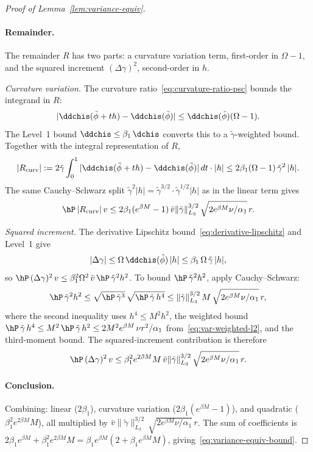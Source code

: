 \documentclass{article}
\begin{document}
\begin{proof}[Proof of Lemma~\ref{lem:variance-equiv}]
\paragraph{Remainder.}
The remainder $R$ has two parts:
a curvature variation term,
first-order in $\Omega - 1$,
and the squared increment $(\Delta\gamma)^2$,
second-order in $h$.

\emph{Curvature variation.}
The curvature ratio~\eqref{eq:curvature-ratio-psc} bounds
the integrand in $R$:
\[
|\ddchis(\tilde\phi+th) - \ddchis(\tilde\phi)|
  \le \ddchis(\tilde\phi)(\Omega - 1).
\]
The Level~1 bound $\ddchis \le \beta_1\, \dchis$
converts this to a $\tilde\gamma$-weighted bound.
Together with the integral representation of $R$,
\[
|R_{\text{curv}}|
  := 2\tilde\gamma
    \int_0^1 |\ddchis(\tilde\phi + th) - \ddchis(\tilde\phi)|\, dt
    \cdot |h|
  \le 2\beta_1(\Omega - 1)\, \tilde\gamma^2\, |h|.
\]
The same Cauchy--Schwarz split
$\tilde\gamma^2 |h| = \tilde\gamma^{3/2} \cdot \tilde\gamma^{1/2} |h|$
as in the linear term gives
\[
\hP\, |R_{\text{curv}}|\, v
  \le 2\beta_1(e^{\beta M}-1)\, \bar{v}
    \|\tilde\gamma\|_{L_3}^{3/2}\,
    \sqrt{2 e^{\beta M}\nu/\alpha_1}\, r.
\]

\emph{Squared increment.}
The derivative Lipschitz
bound~\eqref{eq:derivative-lipschitz}
and Level~1 give
\[
|\Delta\gamma|
  \le \Omega\, \ddchis(\tilde\phi)\, |h|
  \le \beta_1\, \Omega\, \tilde\gamma\, |h|,
\]
so
$\hP\, (\Delta\gamma)^2\, v
  \le \beta_1^2 \Omega^2\, \bar{v}\, \hP\, \tilde\gamma^2 h^2$.
To bound $\hP\, \tilde\gamma^2 h^2$,
apply Cauchy--Schwarz:
\[
\hP\, \tilde\gamma^2 h^2
  \le \sqrt{\hP\, \tilde\gamma^3}\,
    \sqrt{\hP\, \tilde\gamma\, h^4}
  \le \|\tilde\gamma\|_{L_3}^{3/2}\, M\,
    \sqrt{2 e^{\beta M}\nu/\alpha_1}\, r,
\]
where the second inequality uses
$h^4 \le M^2 h^2$,
the weighted bound
$\hP\, \tilde\gamma\, h^4
  \le M^2\, \hP\, \tilde\gamma\, h^2
  \le 2 M^2 e^{\beta M}\, \nu r^2/\alpha_1$
from~\eqref{eq:var-weighted-l2},
and the third-moment bound.
The squared-increment contribution is therefore
\[
\hP\, (\Delta\gamma)^2\, v
  \le \beta_1^2 e^{2\beta M} M\, \bar{v}
    \|\tilde\gamma\|_{L_3}^{3/2}\,
    \sqrt{2 e^{\beta M}\nu/\alpha_1}\, r.
\]

\paragraph{Conclusion.}
Combining: linear ($2\beta_1$),
curvature variation ($2\beta_1(e^{\beta M} - 1)$),
and quadratic ($\beta_1^2 e^{2\beta M} M$),
all multiplied by
$\bar{v} \|\tilde\gamma\|_{L_3}^{3/2}\,
  \sqrt{2 e^{\beta M}\nu/\alpha_1}\, r$.
The sum of coefficients is
$2\beta_1 e^{\beta M} + \beta_1^2 e^{2\beta M} M
  = \beta_1 e^{\beta M}(2 + \beta_1 e^{\beta M} M)$,
giving~\eqref{eq:variance-equiv-bound}.
\end{proof}
\end{document}
